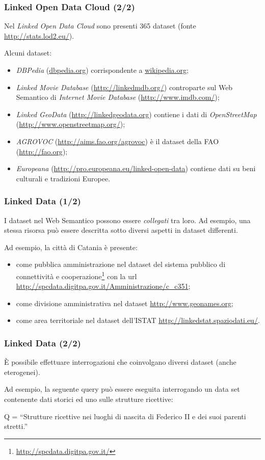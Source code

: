 \documentclass[8pt]{beamer}
\begin{document}
\begin{frame}
\frametitle{Linked Open Data Cloud (2/2)}
Nel \emph{Linked Open Data Cloud} sono presenti 365 dataset (fonte \url{http://stats.lod2.eu/}).
\vspace{\baselineskip}

Alcuni dataset:
\begin{itemize}
 \item \emph{DBPedia} (\url{dbpedia.org}) corrispondente a \url{wikipedia.org};
 \item \emph{Linked Movie Database} (\url{http://linkedmdb.org/}) controparte sul Web Semantico di \emph{Internet Movie Database} 
 (\url{http://www.imdb.com/});
 \item \emph{Linked GeoData} (\url{http://linkedgeodata.org}) 
  contiene i dati di \emph{OpenStreetMap} (\url{http://www.openstreetmap.org/});
  \item \emph{AGROVOC} (\url{http://aims.fao.org/agrovoc}) \`e il dataset della FAO (\url{http://fao.org});
  \item \emph{Europeana} (\url{http://pro.europeana.eu/linked-open-data}) contiene dati su beni culturali e tradizioni Europee. 
\end{itemize}
\end{frame}

\begin{frame}
\frametitle{Linked Data (1/2)}

I dataset nel Web Semantico possono essere \emph{collegati} tra loro. Ad esempio, una stessa risorsa pu\`o essere descritta 
sotto diversi aspetti in dataset differenti.
\vspace{\baselineskip}

Ad esempio, la citt\`a di Catania \`e presente:
\begin{itemize}
 \item come pubblica amministrazione nel dataset del sistema pubblico di connettivit\`a e cooperazione\footnote{\url{http://spcdata.digitpa.gov.it/}}
 con la url \url{http://spcdata.digitpa.gov.it/Amministrazione/c_c351};
 \item come divisione amministrativa nel dataset \url{http://www.geonames.org};
 \item come area territoriale nel dataset dell'ISTAT  \url{http://linkedstat.spaziodati.eu/}.
\end{itemize}
\end{frame}

\begin{frame}
\frametitle{Linked Data (2/2)}
\`E possibile effettuare interrogazioni che coinvolgano diversi
dataset (anche eterogenei).
\vspace{\baselineskip}

Ad esempio, la seguente query pu\`o essere eseguita
interrogando un data set contenente dati storici ed uno 
sulle strutture ricettive:


\begin{center}
Q = “Strutture ricettive nei luoghi di nascita di Federico II e dei suoi parenti stretti.”
\end{center}
\end{frame}
\end{document}

